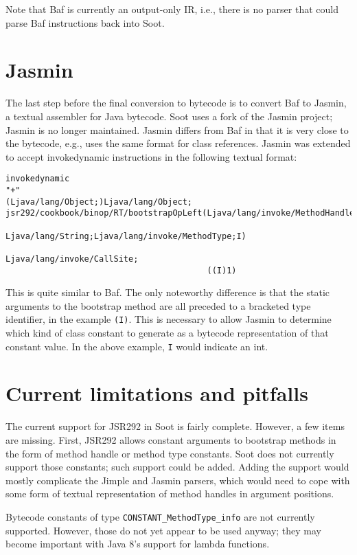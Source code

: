 \documentclass{article}
\begin{document}
Note that Baf is currently an output-only IR, i.e., there is no parser that
could parse Baf instructions back into Soot.

\section{Jasmin}
The last step before the final conversion to bytecode is to convert Baf to
Jasmin, a textual assembler for Java bytecode. Soot uses a fork of the Jasmin
project; Jasmin is no longer maintained. Jasmin differs
from Baf in that it is very close to the bytecode, e.g., uses the same
format for class references. Jasmin was extended to accept invokedynamic
instructions in the following textual format:

\begin{verbatim}
invokedynamic
"+"
(Ljava/lang/Object;)Ljava/lang/Object;
jsr292/cookbook/binop/RT/bootstrapOpLeft(Ljava/lang/invoke/MethodHandles$Lookup;
                                         Ljava/lang/String;Ljava/lang/invoke/MethodType;I)
                                            Ljava/lang/invoke/CallSite;
                                         ((I)1)
\end{verbatim}

This is quite similar to Baf. The only noteworthy difference is that the
static arguments to the bootstrap method are all preceded to a bracketed type
identifier, in the example \texttt{(I)}. This is necessary to allow Jasmin to
determine which kind of class constant to generate as a bytecode representation
of that constant value. In the above example, \texttt{I} would indicate an int.

\section{Current limitations and pitfalls}
The current support for JSR292 in Soot is fairly complete. However, a few items
are missing. First, JSR292 allows constant arguments to bootstrap methods in the
form of method handle or method type constants. Soot does not currently support
those constants; such support could be added. Adding the support would
mostly complicate the Jimple and Jasmin parsers, which would need to cope
with some form of textual representation of method handles in argument
positions.

Bytecode constants of type \texttt{CONSTANT\_MethodType\_info} are not
currently supported. However, those do not yet appear to be used anyway; they
may become important with Java 8's support for lambda functions.
\end{document}
